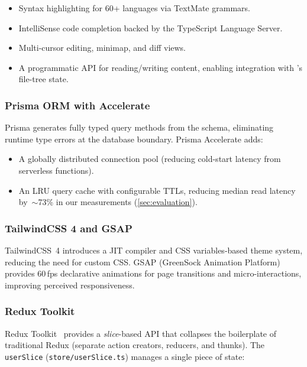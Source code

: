 \begin{itemize}
  \item Syntax highlighting for 60+ languages via TextMate grammars.
  \item IntelliSense code completion backed by the TypeScript Language Server.
  \item Multi-cursor editing, minimap, and diff views.
  \item A programmatic API for reading/writing content, enabling integration
    with \echoray{}'s file-tree state.
\end{itemize}

\subsubsection{Prisma ORM with Accelerate}

Prisma generates fully typed query methods from the schema, eliminating
runtime type errors at the database boundary. Prisma Accelerate adds:

\begin{itemize}
  \item A globally distributed connection pool (reducing cold-start latency
    from serverless functions).
  \item An LRU query cache with configurable TTLs, reducing median read
    latency by~$\sim$73\% in our measurements (\cref{sec:evaluation}).
\end{itemize}

\subsubsection{TailwindCSS 4 and GSAP}

TailwindCSS~4 introduces a JIT compiler and CSS variables-based theme system,
reducing the need for custom CSS. GSAP (GreenSock Animation Platform) provides
60\,fps declarative animations for page transitions and micro-interactions,
improving perceived responsiveness.

\subsubsection{Redux Toolkit}

Redux Toolkit~\cite{reduxToolkit2023} provides a \emph{slice}-based API that
collapses the boilerplate of traditional Redux (separate action creators,
reducers, and thunks). The \texttt{userSlice} (\texttt{store/userSlice.ts})
manages a single piece of state:

